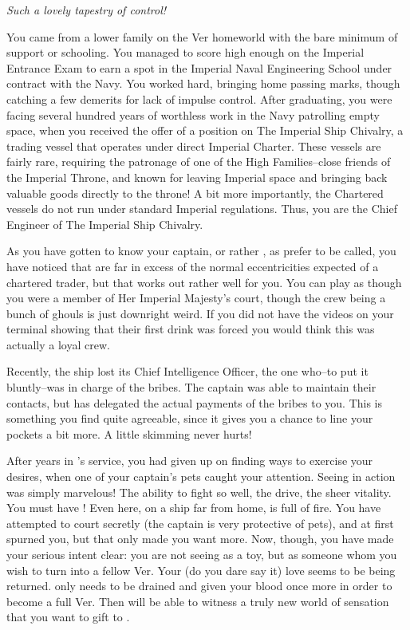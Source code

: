\documentclass[char]{guildcamp4}
\begin{document}
\name{\cVtwo{}}

\textit{Such a lovely tapestry of control!}

You came from a lower family on the Ver homeworld with the bare minimum of support or schooling. You managed to score high enough on the Imperial Entrance Exam to earn a spot in the Imperial Naval Engineering School under contract with the Navy. You worked hard, bringing home passing marks, though catching a few demerits for lack of impulse control. After graduating, you were facing several hundred years of worthless work in the Navy patrolling empty space, when you received the offer of a position on The Imperial Ship Chivalry, a trading vessel that operates under direct Imperial Charter. These vessels are fairly rare, requiring the patronage of one of the High Families--close friends of the Imperial Throne, and known for leaving Imperial space and bringing back valuable goods directly to the throne! A bit more importantly, the Chartered vessels do not run under standard Imperial regulations. Thus, you are the Chief Engineer of The Imperial Ship Chivalry. 

As you have gotten to know your captain, or rather \cVone{\Duke}, as \cVone{\they} prefer to be called, you have noticed that \cVone{\they} are far in excess of the normal eccentricities expected of a chartered trader, but that works out rather well for you. You can play as though you were a member of Her Imperial Majesty's court, though the crew being a bunch of ghouls is just downright weird. If you did not have the videos on your terminal showing that their first drink was forced you would think this was actually a loyal crew.

Recently, the ship lost its Chief Intelligence Officer, the one who--to put it bluntly--was in charge of the bribes. The captain was able to maintain their contacts, but has delegated the actual payments of the bribes to you. This is something you find quite agreeable, since it gives you a chance to line your pockets a bit more. A little skimming never hurts!

After years in \cVone{}'s service, you had given up on finding ways to exercise your desires, when one of your captain's pets caught your attention. Seeing \cJulie{} in action was simply marvelous! The ability to fight so well, the drive, the sheer vitality. You must have \cJulie{\them}! Even here, on a ship far from home, \cJulie{\they} is full of fire. You have attempted to court \cJulie{\them} secretly (the captain is very protective of \cVone{\their} pets), and at first \cJulie{\they} spurned you, but that only made you want \cJulie{\them} more. Now, though, you have made your serious intent clear: you are not seeing \cJulie{\them} as a toy, but as someone whom you wish to turn into a fellow Ver. Your (do you dare say it) love seems to be being returned. \cJulie{} only needs to be drained and given your blood once more in order to become a full Ver. Then \cJulie{\they} will be able to witness a truly new world of sensation that you want to gift to \cJulie{\them}.
\end{document}
